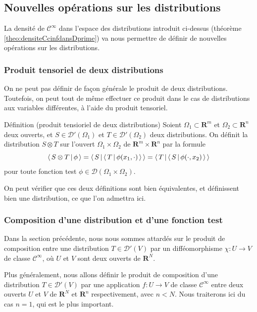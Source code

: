     \subsection{Nouvelles opérations sur les distributions}

        La densité de $\mathcal{C}^{\infty}$ dans l’espace des distributions introduit ci-dessus (théorème \ref{theo:densiteCcinfdansDprime}) va nous permettre de définir de nouvelles opérations sur les distributions.

        \subsubsection{Produit tensoriel de deux distributions}

        On ne peut pas définir de façon générale le produit de deux distributions. Toutefois, on peut tout de même effectuer ce produit dans le cas de distributions aux variables différentes, à l’aide du produit tensoriel.

        \begin{omed}{Définition (produit tensioriel de deux distributions)}
            Soient $\Omega_1 \subset \mathbf{R}^m$ et $\Omega_2 \subset \mathbf{R}^n$ deux ouverts, et $S \in \mathcal{D}'(\Omega_1)$ et $T \in \mathcal{D}'(\Omega_2)$ deux distributions. On définit la distribution $S \otimes T$ sur l’ouvert $\Omega_1 \times \Omega_2$ de $\mathbf{R}^m \times \mathbf{R}^n$ par la formule
            \[ \left< \, S \otimes T \, \middle| \, \phi \, \right> = \left< \, S \, \middle| \, \left< \, T \, \middle| \, \phi(x_1, \cdot) \, \right> \, \right> = \left< \, T \, \middle| \, \left< \, S \, \middle| \, \phi(\cdot, x_2) \, \right> \, \right> \]    
            pour toute fonction test $\phi \in \mathcal{D}(\Omega_1 \times \Omega_2)$.
        \end{omed}

        On peut vérifier que ces deux définitions sont bien équivalentes, et définissent bien une distribution, ce que l’on admettra ici.

        \subsubsection{Composition d’une distribution et d’une fonction test}

        Dans la section précédente, nous nous sommes attardés sur le produit de composition entre une distribution $T \in \mathcal{D}'(V)$ par un difféomorphisme $\chi : U \to V$ de classe $\mathcal{C}^{\infty}$, où $U$ et $V$ sont deux ouverts de $\mathbf{R}^N$.

        Plus généralement, nous allons définir le produit de composition d’une distribution $T \in \mathcal{D}'(V)$ par une application $f : U \to V$ de classe $\mathcal{C}^{\infty}$ entre deux ouverts $U$ et $V$ de $\mathbf{R}^N$ et $\mathbf{R}^n$ respectivement, avec $n < N$. Nous traiterons ici du cas $n = 1$, qui est le plus important.

